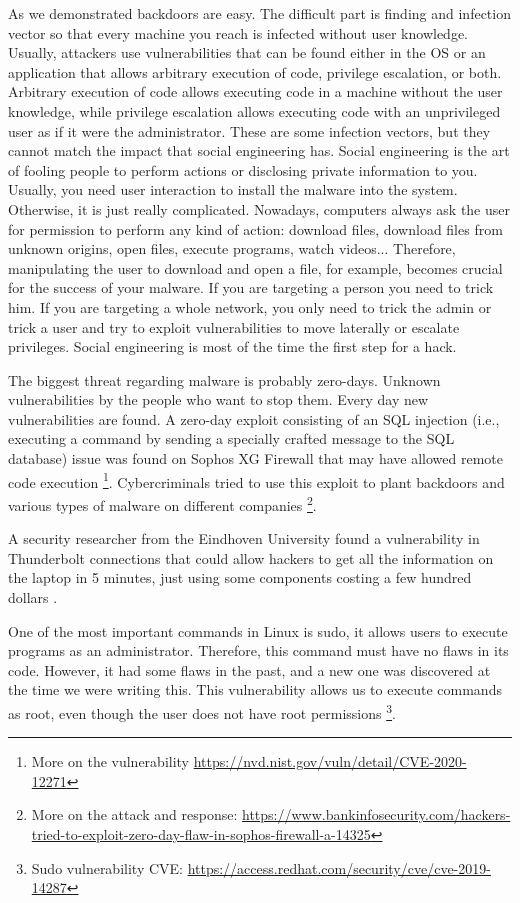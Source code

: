 \documentclass[11pt, a4paper,twoside]{tesi_upf}
\begin{document}
As we demonstrated backdoors are easy. The difficult part is finding and infection vector so that every machine you reach is infected without user knowledge. Usually, attackers use vulnerabilities that can be found either in the OS or an application that allows arbitrary execution of code, privilege escalation, or both. Arbitrary execution of code allows executing code in a machine without the user knowledge, while privilege escalation allows executing code with an unprivileged user as if it were the administrator. These are some infection vectors, but they cannot match the impact that social engineering has. Social engineering is the art of fooling people to perform actions or disclosing private information to you. Usually, you need user interaction to install the malware into the system. Otherwise, it is just really complicated. Nowadays, computers always ask the user for permission to perform any kind of action: download files, download files from unknown origins, open files, execute programs, watch videos... Therefore, manipulating the user to download and open a file, for example, becomes crucial for the success of your malware. If you are targeting a person you need to trick him. If you are targeting a whole network, you only need to trick the admin or trick a user and try to exploit vulnerabilities to move laterally or escalate privileges. Social engineering is most of the time the first step for a hack.

The biggest threat regarding malware is probably zero-days. Unknown vulnerabilities by the people who want to stop them.
Every day new vulnerabilities are found. A zero-day exploit consisting of an SQL injection (i.e., executing a command by sending a specially crafted message to the SQL database) issue was found on Sophos XG Firewall that may have allowed remote code execution \footnote{More on the vulnerability \url{https://nvd.nist.gov/vuln/detail/CVE-2020-12271}}. Cybercriminals tried to use this exploit to plant backdoors and various types of malware on different companies \footnote{More on the attack and response: \url{https://www.bankinfosecurity.com/hackers-tried-to-exploit-zero-day-flaw-in-sophos-firewall-a-14325}}.

A security researcher from the Eindhoven University found a vulnerability in Thunderbolt connections that could allow hackers to get all the information on the laptop in 5 minutes, just using some components costing a few hundred dollars \cite{thunderbolt}.

One of the most important commands in Linux is sudo, it allows users to execute programs as an administrator. Therefore, this command must have no flaws in its code. However, it had some flaws in the past, and a new one was discovered at the time we were writing this. This vulnerability allows us to execute commands as root, even though the user does not have root permissions \footnote{Sudo vulnerability CVE: \url{https://access.redhat.com/security/cve/cve-2019-14287}}.
\end{document}
